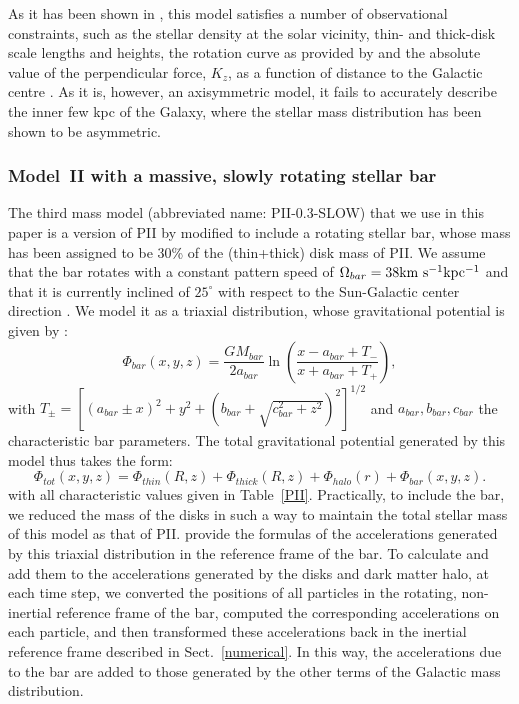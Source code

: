         As it has been shown in \citet{2017A&A...598A..66P}, this model satisfies a number of observational constraints, such as the stellar density at the solar vicinity, thin- and thick-disk scale lengths and heights, the rotation curve as provided by \citet{reid14}  and the absolute value of the perpendicular force, $K_z$, as a function of distance to the Galactic centre \citep[see Sect.~2.5 in][]{2017A&A...598A..66P}. As it is, however, an axisymmetric model, it fails to  accurately describe the inner few kpc of the Galaxy, where the stellar mass distribution has been shown to be asymmetric.     

    \subsubsection{Model~II with a massive, slowly rotating stellar bar}
        The third mass model (abbreviated name: PII-0.3-SLOW)  that we use in this paper is a version of PII by \citet{2017A&A...598A..66P} modified to include a rotating stellar bar, whose mass has been assigned to be 30\% of the (thin+thick) disk mass of PII. We assume that the bar rotates with a constant pattern speed of $\Omega_{bar}=38\rm km~s^{-1}kpc^{-1}$ and that it is currently inclined of $25^\circ$ with respect to the Sun-Galactic center direction \citep[see][]{2016ARA&A..54..529B}. We model it as a triaxial distribution, whose gravitational potential is given by  \citet{1992ApJ...397...44L}:
        \begin{equation}
            \Phi_{bar}(x,y,z)=\frac{GM_{bar}}{2a_{bar}}\ln\left( \frac{x-a_{bar}+T_{-}}{x+a_{bar}+T_{+}}   \right),
        \end{equation}
        with $T_{\pm}=\left[ (a_{bar}\pm x)^2+ y^2 +  (b_{bar}+ \sqrt{c_{bar}^2+z^2})^2 \right]^{1/2}$
        and $a_{bar}, b_{bar}, c_{bar}$ the characteristic bar parameters. The total gravitational potential generated by this model thus takes the form:
        \begin{equation}
            \Phi_{tot}(x, y, z) = \Phi_{thin}(R, z) + \Phi_{thick}(R, z) + \Phi_{halo}(r)+  \Phi_{bar}(x, y, z).
        \end{equation}
        with all characteristic values given in Table~\ref{PII}. Practically, to include the bar, we reduced the mass of the disks in such a way to maintain the total stellar mass of this model as that of PII.  \citet{1992ApJ...397...44L} provide the formulas of the accelerations generated by this triaxial distribution in the reference frame of the bar. To calculate and add them to the accelerations generated by the disks and dark matter halo, at each time step, we converted the positions of all particles  in the rotating, non-inertial reference frame of the bar, computed the corresponding accelerations on each particle, and then transformed these accelerations back in the inertial reference frame described in Sect.~\ref{numerical}. In this way, the accelerations due to the bar are added to those generated by the other terms of the Galactic mass distribution. 

